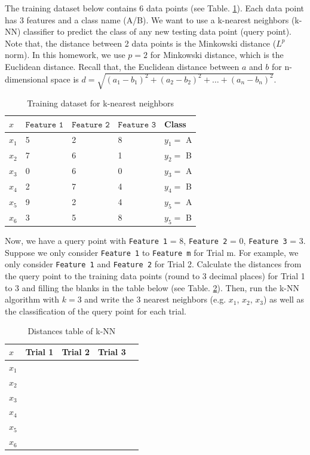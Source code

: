 \documentclass{homework}
\begin{document}
The training dataset below contains 6 data points (see Table. \ref{table:knn_train_data}). Each data point has 3 features and a class name (A/B). We want to use a k-nearest neighbors (k-NN) classifier to predict the class of any new testing data point (query point). Note that, the distance between 2 data points is the Minkowski distance ($L^p$ norm). In this homework, we use $p=2$ for Minkowski distance, which is the Euclidean distance. Recall that, the Euclidean distance between $a$ and $b$ for n-dimensional space is $d = \sqrt{(a_1 - b_1)^2 + (a_2 - b_2)^2 + \dots + (a_n - b_n)^2}$.

\begin{table}[h]
\centering
\begin{tabular}{|l|l|l|l|l|}
\hline
$x$ & $\texttt{Feature 1}$ & $\texttt{Feature 2}$ & $\texttt{Feature 3}$ & Class\\
\hline
$x_{1}$ & 5 & 2 & 8 & $y_{1}=$ A \\
\hline
$x_{2}$ & 7 & 6 & 1 & $y_{2}=$ B \\
\hline
$x_{3}$ & 0 & 6 & 0 & $y_{3}=$ A \\
\hline
$x_{4}$ & 2 & 7 & 4 & $y_{4}=$ B \\
\hline
$x_{5}$ & 9 & 2 & 4 & $y_{5}=$ A \\
\hline
$x_{6}$ & 3 & 5 & 8 & $y_{5}=$ B \\
\hline
\end{tabular}
\caption{Training dataset for k-nearest neighbors}
\label{table:knn_train_data}
\end{table}


Now, we have a query point with \texttt{Feature 1} = 8, \texttt{Feature 2} = 0, \texttt{Feature 3} = 3. Suppose we only consider \texttt{Feature 1} to \texttt{Feature m} for Trial m. For example, we only consider \texttt{Feature 1} and \texttt{Feature 2} for Trial 2. Calculate the distances from the query point to the training data points (round to 3 decimal places) for Trial 1 to 3 and filling the blanks in the table below (see Table. \ref{table:knn_distances}). Then, run the k-NN algorithm with $k=3$ and write the 3 nearest neighbors (e.g. $x_{1}$, $x_{2}$, $x_{3}$) as well as the classification of the query point for each trial.
    
    \begin{table}[h!]
    \centering
    \begin{tabular}{|l|l|l|l|l|}
    \hline
    $x$ & Trial 1 & Trial 2 & Trial 3\\
    \hline
    $x_{1}$ &  &  &  \\
    \hline
    $x_{2}$ &  &  &  \\
    \hline
    $x_{3}$ &  &  &  \\
    \hline
    $x_{4}$ &  &  &  \\
    \hline
    $x_{5}$ &  &  &  \\
    \hline
    $x_{6}$ &  &  &  \\
    \hline
    \end{tabular}
    \caption{Distances table of k-NN}
    \label{table:knn_distances}
    \end{table}
\end{document}
